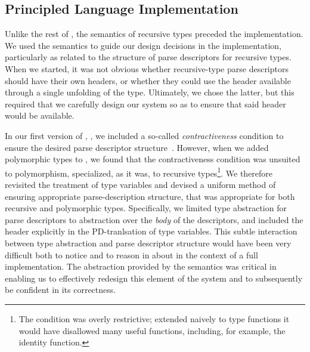 
\subsection{Principled Language Implementation}

Unlike the rest of \padsc{}, the semantics of recursive types preceded
the implementation. We used the semantics to guide our design
decisions in the implementation, particularly as related to the structure of parse descriptors for recursive types. When we started, it was not obvious whether recursive-type parse descriptors should have their own headers, or whether they could use the header available through a single unfolding of the type. Ultimately, we chose the latter, but this required that we carefully design our system so as to ensure that said header would be available. 

In our first version of \ddc{}, \ddcold{}, we included a so-called \textit{contractiveness} condition to ensure the desired parse descriptor structure~\cite{fisher+:popl06}. However, when we added polymorphic types to \ddcold{}, we found that the contractiveness condition was unsuited to polymorphism, specialized, as it was, to recursive types\footnote{The condition was overly restrictive; extended naively to type functions it would have disallowed many useful functions, including, for example, the identity function.}. We therefore revisited the treatment of type variables and devised a uniform method of ensuring appropriate parse-description structure, that was appropriate for both recursive and polymorphic types. Specifically, we limited type abstraction for parse descriptors to abstraction over the \textit{body} of the descriptors, and included the header explicitly in the PD-tranlsation of type variables. This subtle interaction between type abstraction and parse descriptor structure would have been very difficult both to notice and to reason in about in the context of a full implementation. The abstraction provided by the semantics was critical in enabling us to effectively redesign this element of the system and to subsequently be confident in its correctness.

